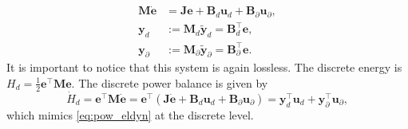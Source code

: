 \documentclass{svjour3}                     %
\begin{document}
\begin{equation}
\begin{aligned}
\mathbf{M} \dot{\mathbf{e}} &= \mathbf{J} \mathbf{e} + \mathbf{B}_d \mathbf{u}_d + \mathbf{B}_\partial \mathbf{u}_\partial, \\
\mathbf{y}_d &:= \mathbf{M}_d \widetilde{\mathbf{y}}_d = \mathbf{B}_d^\top \mathbf{e},  \\
\mathbf{y}_\partial &:= \mathbf{M}_\partial \widetilde{\mathbf{y}}_\partial = \mathbf{B}_\partial^\top \mathbf{e}.
\end{aligned}
\end{equation}
It is important to notice that this system is again lossless. The discrete energy is $H_d = \frac{1}{2} \mathbf{e}^\top \mathbf{M} \mathbf{e}$.
The discrete power balance is given by
\begin{equation*}
\dot{H}_d = \mathbf{e}^\top \mathbf{M} \dot{\mathbf{e}} = \mathbf{e}^\top ( \mathbf{J} \dot{\mathbf{e}} + \mathbf{B}_d \mathbf{u}_d + \mathbf{B}_\partial \mathbf{u}_\partial) = \mathbf{y}_d^\top \mathbf{u}_d + \mathbf{y}_\partial^\top \mathbf{u}_\partial,
\end{equation*}
which mimics \eqref{eq:pow_eldyn} at the discrete level.
\end{document}
